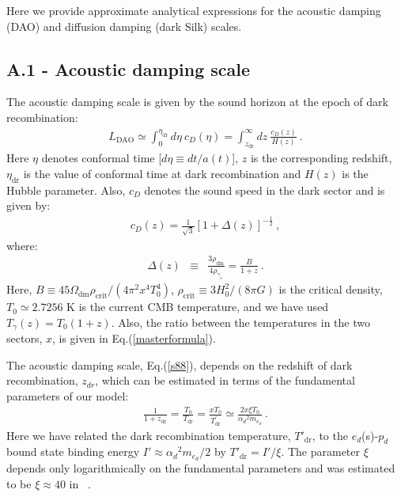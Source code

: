 \documentclass[12pt]{article}
\begin{document}
Here we provide approximate analytical expressions for the acoustic damping (DAO) and diffusion damping (dark Silk) scales. 

\subsection*{A.1 - Acoustic damping scale}

The acoustic damping scale is given by the sound horizon at the epoch of dark recombination: 
%
\begin{eqnarray}
L_{\text{DAO}} \simeq \int _0 ^{\eta _{\text{dr}}} d\eta \ c_D(\eta) 
= \int _{z_{\text{dr}}} ^{\infty} dz \ \frac{c_D(z)}{H(z)} \ . 
\label{s88}
\end{eqnarray}
%
Here $\eta$ denotes conformal time [$d\eta \equiv dt/a(t)$], $z$ is the corresponding redshift, $\eta _{\text{dr}}$ is the value of conformal time at dark recombination and $H(z)$ is the Hubble parameter. Also, $c_D$ denotes the sound speed in the dark sector and is given by:
%
\begin{eqnarray}
c_D(z) = \frac{1}{\sqrt{3}} \left [ 1 + \Delta (z) \right ] ^{-\frac{1}{2}} \ , 
\end{eqnarray}
where:
\begin{eqnarray}
\Delta (z) &\equiv & \frac{3\rho_{\text{dm}}}{4\rho_{\gamma_{_D}}} =  \frac{B}{1+z}  \ .
\label{delta}
\end{eqnarray}
%
Here, $B \equiv  45 \Omega_{\text{dm}} \rho_{\text{crit}}/(4\pi^2 x^4 T_0^4)$, $\rho_{\text{crit}} \equiv 3H_0^2/(8\pi G)$ is the critical density, $T_0 \simeq 2.7256$ K is the current CMB temperature, and we have used $T_{\gamma} (z) = T_0 (1 + z)$. Also, the ratio between the temperatures in the two sectors, $x$, is given in Eq.(\ref{masterformula}). 

The acoustic damping scale, Eq.(\ref{s88}), depends on the redshift of dark recombination, $z_{dr}$, which can be estimated in terms of the fundamental parameters of our model: 
%
\begin{eqnarray}
\frac{1}{1+z_{\text{dr}}} = \frac{T_0}{T_{\text{dr}}} = \frac{x T_0}{T_{\text{dr}}^{'}} \simeq \frac{2 x \xi T_0}{{\alpha_d}^2 m_{e_d}} \ .
\label{zdr}
\end{eqnarray}
%
Here we have related the dark recombination temperature, $T'_{\text{dr}}$, to the $e_d$(s)-$p_d$ bound state binding energy $I' \approx {\alpha_d}^2m_{e_d}/2$ by $T'_{\text{dr}} = I'/\xi$.  The parameter $\xi$ depends only logarithmically on the fundamental parameters and  was estimated to be $\xi \approx 40$ in ~\cite{rich8}.
\end{document}
